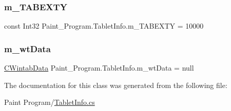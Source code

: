 \subsubsection{\texorpdfstring{m\+\_\+\+T\+A\+B\+E\+X\+TY}{m\_TABEXTY}}
{\footnotesize\ttfamily const Int32 Paint\+\_\+\+Program.\+Tablet\+Info.\+m\+\_\+\+T\+A\+B\+E\+X\+TY = 10000\hspace{0.3cm}{\ttfamily [private]}}

\mbox{\label{class_paint___program_1_1_tablet_info_a7c514892b904d4d34d22791cd9047b82}} 
\subsubsection{\texorpdfstring{m\+\_\+wt\+Data}{m\_wtData}}
{\footnotesize\ttfamily \mbox{\hyperlink{class_wintab_d_n_1_1_c_wintab_data}{C\+Wintab\+Data}} Paint\+\_\+\+Program.\+Tablet\+Info.\+m\+\_\+wt\+Data = null\hspace{0.3cm}{\ttfamily [private]}}



The documentation for this class was generated from the following file\+:\begin{DoxyCompactItemize}
\item 
Paint Program/\mbox{\hyperlink{_tablet_info_8cs}{Tablet\+Info.\+cs}}\end{DoxyCompactItemize}
